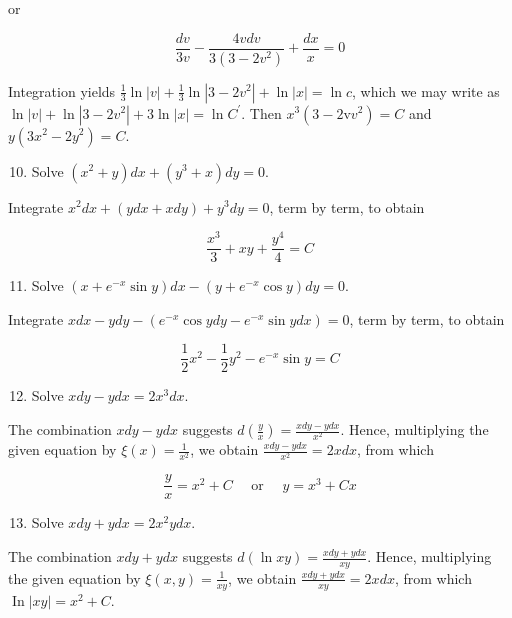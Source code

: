 \documentclass[10pt]{article}
\begin{document}
or

$$
\frac{d v}{3 v}-\frac{4 v d v}{3\left(3-2 v^{2}\right)}+\frac{d x}{x}=0
$$

Integration yields $\frac{1}{3} \ln |v|+\frac{1}{3} \ln \left|3-2 v^{2}\right|+\ln |x|=\ln c$, which we may write as $\ln |v|+\ln \left|3-2 v^{2}\right|+3 \ln |x|=\ln C^{\prime}$. Then $x^{3}\left(3-2 \mathrm{v} v^{2}\right)=C$ and $y\left(3 x^{2}-2 y^{2}\right)=C$.

\begin{enumerate}
  \setcounter{enumi}{9}
  \item Solve $\left(x^{2}+y\right) d x+\left(y^{3}+x\right) d y=0$.
\end{enumerate}

Integrate $x^{2} d x+(y d x+x d y)+y^{3} d y=0$, term by term, to obtain

$$
\frac{x^{3}}{3}+x y+\frac{y^{4}}{4}=C
$$

\begin{enumerate}
  \setcounter{enumi}{10}
  \item Solve $\left(x+e^{-x} \sin y\right) d x-\left(y+e^{-x} \cos y\right) d y=0$.
\end{enumerate}

Integrate $x d x-y d y-\left(e^{-x} \cos y d y-e^{-x} \sin y d x\right)=0$, term by term, to obtain

$$
\frac{1}{2} x^{2}-\frac{1}{2} y^{2}-e^{-x} \sin y=C
$$

\begin{enumerate}
  \setcounter{enumi}{11}
  \item Solve $x d y-y d x=2 x^{3} d x$.
\end{enumerate}

The combination $x d y-y d x$ suggests $d\left(\frac{y}{x}\right)=\frac{x d y-y d x}{x^{2}}$. Hence, multiplying the given equation by $\xi(x)=\frac{1}{x^{2}}$, we obtain $\frac{x d y-y d x}{x^{2}}=2 x d x$, from which

$$
\frac{y}{x}=x^{2}+C \quad \text { or } \quad y=x^{3}+C x
$$

\begin{enumerate}
  \setcounter{enumi}{12}
  \item Solve $x d y+y d x=2 x^{2} y d x$.
\end{enumerate}

The combination $x d y+y d x$ suggests $d(\ln x y)=\frac{x d y+y d x}{x y}$. Hence, multiplying the given equation by $\xi(x, y)=\frac{1}{x y}$, we obtain $\frac{x d y+y d x}{x y}=2 x d x$, from which $\operatorname{In}|x y|=x^{2}+C$.
\end{document}
